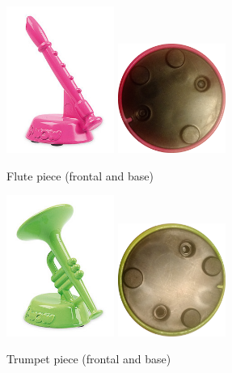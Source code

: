 \begin{figure}[ht!]
	\centering
	\includegraphics[width=100pt]{graphics/architecture/pieces/pieceWoodwind.jpg}
	\vspace{0.6cm}
	\includegraphics[width=100pt]{graphics/architecture/pieces/woodwindBase.png}
	\caption{Flute piece (frontal and base)}
	\label{fig:woodwindpiece}
\end{figure}

\begin{figure}[ht!]
	\centering
	\includegraphics[width=100pt]{graphics/architecture/pieces/pieceBrass.jpg}
	\vspace{0.6cm}
	\includegraphics[width=100pt]{graphics/architecture/pieces/brassBase.png}
	\caption{Trumpet piece (frontal and base)}
	\label{fig:brasspiece}
\end{figure}
\FloatBarrier

